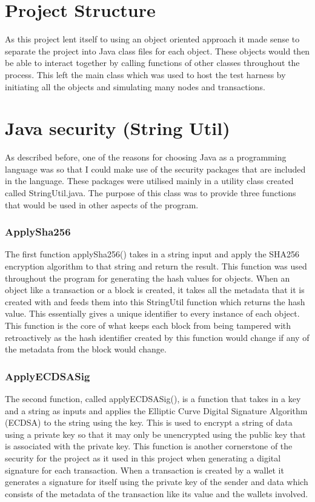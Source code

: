 \documentclass{l4proj}
\begin{document}
\section{Project Structure}
As this project lent itself to using an object oriented approach it made sense to separate the project into
Java class files for each object. These objects would then be able to interact together by calling functions
of other classes throughout the process. This left the main class which was used to host the test harness by
initiating all the objects and simulating many nodes and transactions.


\section{Java security (String Util)}
As described before, one of the reasons for choosing Java as a programming language was so that I could make use
of the security packages that are included in the language. These packages were utilised mainly in a utility class created
called StringUtil.java. The purpose of this class was to provide three functions that would be used in other aspects
of the program. 
\subsubsection{ApplySha256}
The first function applySha256() takes in a string input and apply the SHA256 encryption
algorithm to that string and return the result. This function was used throughout the program for generating
the hash values for objects. When an object like a transaction or a block is created, it takes all the metadata that
it is created with and feeds them into this StringUtil function which returns the hash value. This essentially gives
a unique identifier to every instance of each object. This function is the core of what keeps each block from being
tampered with retroactively as the hash identifier created by this function would change if any of the metadata from
the block would change.


\subsubsection{ApplyECDSASig}
The second function, called applyECDSASig(), is a function that takes in a key and a string as inputs and
applies the Elliptic Curve Digital Signature Algorithm (ECDSA) to the string using the key. This is used to encrypt a string
of data using a private key so that it may only be unencrypted using the public key that is associated with the private
key. This function is another cornerstone of the security for the project as it used in this project when generating
a digital signature for each transaction. When a transaction is created by a wallet it generates a signature for
itself using the private key of the sender and data which consists of the metadata of the transaction like its value
and the wallets involved. 
\end{document}
